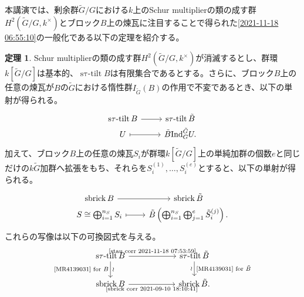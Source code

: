 \documentclass[dvipdfmx]{msjproc}
\newcommand{\induc}{{\operatorname{Ind}\nolimits}}
\newcommand{\stautilt}{\operatorname{\mathrm{s\tau-tilt}}}
\newcommand{\twotilt}{\operatorname{\mathrm{2-tilt}}}
\newcommand{\sbrick}{\operatorname{\mathrm{sbrick}}}
\newcommand{\inertiagp}{I}
\theoremstyle{definition}
\newtheorem{theorem}{定理}
\begin{document}
本講演では、剰余群\(\tilde{G}/G\)における\(k\)上のSchur multiplierの類の成す群\(H^2(\tilde{G}/G,k^\times)\)とブロック\(B\)上の煉瓦に注目することで得られた\cref{2021-11-18 06:55:10}の一般化である以下の定理を紹介する。
\begin{theorem}
	Schur multiplierの類の成す群\(H^2(\tilde{G}/G,k^\times)\)が消滅するとし、群環\(k[\tilde{G}/G]\)は基本的、\(\stautilt B\)は有限集合であるとする。さらに、ブロック\(B\)上の任意の煉瓦が\(B\)の\(\tilde{G}\)における惰性群\(\inertiagp_{\tilde{G}}(B)\)の作用で不変であるとき、以下の単射が得られる。
	\begin{equation}\label{stau corr 2021-11-18 07:53:59}
		\begin{tikzcd}[ampersand replacement=\&,row sep=1pt]
			\stautilt B \ar[r]\&\stautilt \tilde{B}\\
			U\ar[r,mapsto]\&\tilde{B}\induc_G^{\tilde{G}} U.
		\end{tikzcd}
	\end{equation}
	加えて、ブロック\(B\)上の任意の煉瓦\(S_i\)が群環\(k[\tilde{G}/G]\)上の単純加群の個数\(e\)と同じだけの\(k\tilde{G}\)加群へ拡張をもち、それらを\(S_i^{(1)}, \ldots, S_i^{(e)}\)とすると、以下の単射が得られる。
	\begin{equation}\label{sbrick corr 2021-09-10 18:10:41}
		\begin{tikzcd}[ampersand replacement=\&,row sep=1pt]
			\sbrick B \ar[r]\&\sbrick \tilde{B}\\
			S\cong \bigoplus_{i=1}^{n_{S}}S_i\ar[r,mapsto]\& \tilde{B}\left( \bigoplus_{i=1}^{n_S}\bigoplus_{j=1}^{e}\tilde{S}_i^{(j)} \right).
		\end{tikzcd}
	\end{equation}
	これらの写像は以下の可換図式を与える。
	\begin{equation}
		\begin{tikzcd}[ampersand replacement=\&, column sep=2cm]
			\stautilt B\ar[d,"\text{\cite{MR4139031} for \(B\)}"',"\wr"] \ar[r,"\text{\eqref{stau corr 2021-11-18 07:53:59}}"]\&\stautilt \tilde{B} \ar[d,"\text{\cite{MR4139031} for \(\tilde{B}\)}","\wr"']\\
			\sbrick B\ar[r,"\text{\eqref{sbrick corr 2021-09-10 18:10:41}}"']\&\sbrick \tilde{B}.
		\end{tikzcd}
	\end{equation}
	
\end{theorem}
\end{document}

